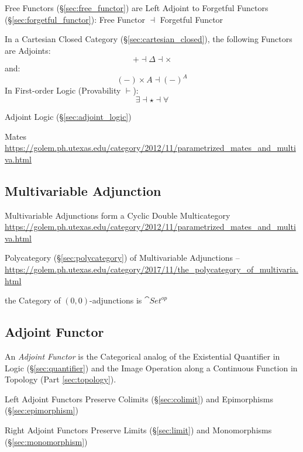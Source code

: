 Free Functors (\S\ref{sec:free_functor}) are Left Adjoint to Forgetful
Functors (\S\ref{sec:forgetful_functor}): Free Functor $\dashv$
Forgetful Functor

In a Cartesian Closed Category (\S\ref{sec:cartesian_closed}), the
following Functors are Adjoints:
\[
  + \dashv \Delta \dashv \times
\]
and:
\[
  (-) \times A \dashv (-)^A
\]
In First-order Logic (Provability $\vdash$):
\[
  \exists \dashv \star \dashv \forall
\]

Adjoint Logic (\S\ref{sec:adjoint_logic})

Mates
\url{https://golem.ph.utexas.edu/category/2012/11/parametrized_mates_and_multiva.html}



\subsection{Multivariable Adjunction}\label{sec:multivariable_adjunction}

Multivariable Adjunctions form a Cyclic Double Multicategory
\url{https://golem.ph.utexas.edu/category/2012/11/parametrized_mates_and_multiva.html}

Polycategory (\S\ref{sec:polycategory}) of Multivariable Adjunctions --
\url{https://golem.ph.utexas.edu/category/2017/11/the_polycategory_of_multivaria.html}

the Category of $(0,0)$-adjunctions is $\cat{Set}^{op}$



\subsection{Adjoint Functor}\label{sec:adjoint_functor}

An \emph{Adjoint Functor} is the Categorical analog of the Existential
Quantifier in Logic (\S\ref{sec:quantifier}) and the Image Operation
along a Continuous Function in Topology (Part \ref{sec:topology}).

Left Adjoint Functors Preserve Colimits (\S\ref{sec:colimit}) and
Epimorphisms (\S\ref{sec:epimorphism})

Right Adjoint Functors Preserve Limits (\S\ref{sec:limit}) and
Monomorphisms (\S\ref{sec:monomorphism})

